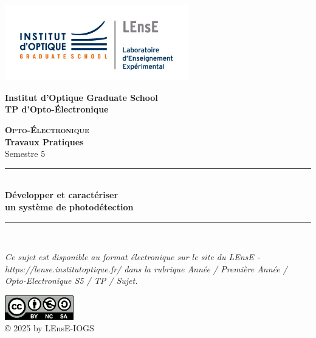 \documentclass[a4paper,11pt,twoside]{book} %
\begin{document}
\begin{titlepage}

\begin{center}
	\begin{minipage}{2.5cm}
	\begin{center}
		\includegraphics[width=8cm]{images/LEnsE_IOGS.jpg}
	\end{center}
\end{minipage}\hfill
\begin{minipage}{10cm}
	\begin{center}
	\textbf{Institut d'Optique Graduate School }\\[0.1cm]
    \textbf{TP d'Opto-Électronique}


	\end{center}
\end{minipage}\hfill


\vspace{4cm}


{\huge \bfseries \textsc{Opto-Électronique}} \\[0.5cm]
{\large \bfseries Travaux Pratiques} \\[0.2cm]
Semestre 5

\vspace{2cm}
\rule{\linewidth}{0.3mm} \\[0.4cm]
{ \huge \bfseries\color{violet_iogs} Développer et caractériser \\ un système de photodétection \\[0.4cm] }
\rule{\linewidth}{0.3mm} \\[1cm]

\vspace{4cm}


\textit{Ce sujet est disponible au format électronique sur le site du LEnsE - https://lense.institutoptique.fr/ dans la rubrique Année / Première Année / Opto-Electronique S5 / TP / Sujet.}

\vspace{1cm}

\begin{minipage}{5cm}
\begin{center}
\includegraphics[width=3cm]{./images/logocc}\\
\small
  © 2025 by LEnsE-IOGS 
\end{center}
\end{minipage}

\end{center}
\end{titlepage}
\end{document}
